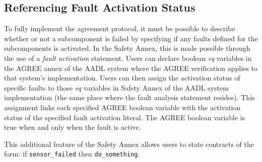 \subsection{Referencing Fault Activation Status}
To fully implement the agreement protocol, it must be possible to describe whether or not a subcomponent is failed by specifying if any faults defined for the subcomponents is activated. In the Safety Annex, this is made possible through the use of a \textit{fault activation} statement. Users can declare boolean \textit{eq} variables in the AGREE annex of the AADL system where the AGREE verification applies to that system's implementation. %
Users can then assign the activation status of specific faults to those \textit{eq} variables in Safety Annex of the AADL system implementation (the same place where the fault analysis statement resides).
This assignment links each specified AGREE boolean variable with the 
activation status of the specified fault activation literal. %
The AGREE boolean variable is true when and only when the fault is active.

This additional feature of the Safety Annex allows users to state contracts of the form: if \texttt{sensor\_failed} then \texttt{do\_something}.

 

